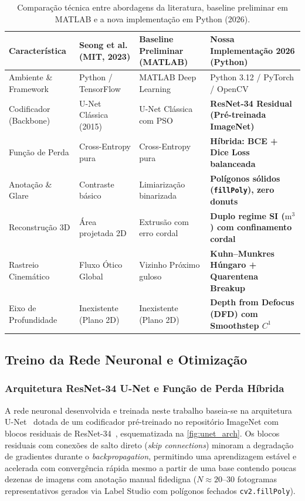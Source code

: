\begin{table}[!htbp]
\centering
\small
\caption{Comparação técnica entre abordagens da literatura, baseline preliminar em MATLAB e a nova implementação em Python (2026).}
\label{tab:comparacao_tecnica}
\begin{tabularx}{\textwidth}{>{\raggedright\arraybackslash}p{3.2cm}>{\raggedright\arraybackslash}X>{\raggedright\arraybackslash}X>{\raggedright\arraybackslash}X}
\toprule
\textbf{Característica} & \textbf{Seong et al. (MIT, 2023)} & \textbf{Baseline Preliminar (MATLAB)} & \textbf{Nossa Implementação 2026 (Python)} \\
\midrule
Ambiente \& Framework & Python / TensorFlow & MATLAB Deep Learning & Python 3.12 / PyTorch / OpenCV \\
Codificador (Backbone) & U-Net Clássica (2015) & U-Net Clássica com PSO & \textbf{ResNet-34 Residual (Pré-treinada ImageNet)} \\
Função de Perda & Cross-Entropy pura & Cross-Entropy pura & \textbf{Híbrida: BCE + Dice Loss balanceada} \\
Anotação \& Glare & Contraste básico & Limiarização binarizada & \textbf{Polígonos sólidos (\texttt{fillPoly}), zero donuts} \\
Reconstrução 3D & Área projetada 2D & Extrusão com erro cordal & \textbf{Duplo regime SI ($\mathrm{m}^3$) com confinamento cordal} \\
Rastreio Cinemático & Fluxo Ótico Global & Vizinho Próximo guloso & \textbf{Kuhn--Munkres Húngaro + Quarentena Breakup} \\
Eixo de Profundidade & Inexistente (Plano 2D) & Inexistente (Plano 2D) & \textbf{Depth from Defocus (DFD) com Smoothstep $C^1$} \\
\bottomrule
\end{tabularx}
\end{table}

\subsection{Treino da Rede Neuronal e Otimização}
\label{subsec:treino_unet}

\subsubsection{Arquitetura ResNet-34 U-Net e Função de Perda Híbrida}
\label{subsubsec:unet_arch_loss}

A rede neuronal desenvolvida e treinada neste trabalho baseia-se na arquitetura U-Net~\cite{ronneberger2015unet} dotada de um codificador pré-treinado no repositório ImageNet com blocos residuais de ResNet-34~\cite{he2016deep}, esquematizada na \autoref{fig:unet_arch}. Os blocos residuais com conexões de salto direto (\emph{skip connections}) minoram a degradação de gradientes durante o \emph{backpropagation}, permitindo uma aprendizagem estável e acelerada com convergência rápida mesmo a partir de uma base contendo poucas dezenas de imagens com anotação manual fidedigna ($N \approx 20\text{--}30$ fotogramas representativos gerados via Label Studio com polígonos fechados \texttt{cv2.fillPoly}).

